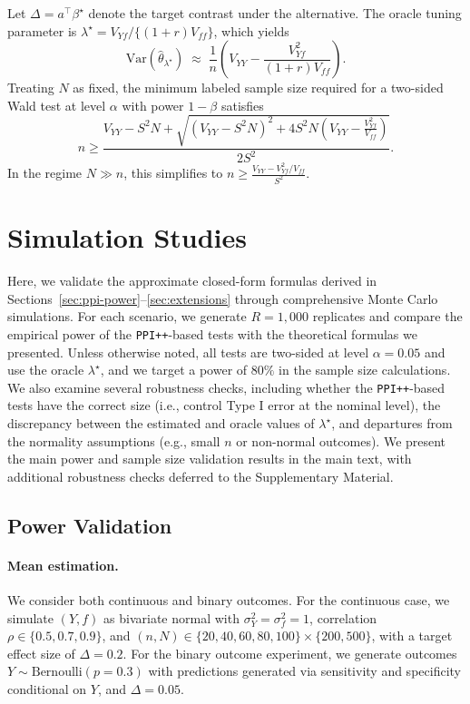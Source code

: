 \documentclass[12pt]{article}
\newcommand{\Var}{\mathrm{Var}}
\newcommand{\wh}{\widehat}
\begin{document}
\begin{proposition}\label{prop:regression-n}
Let $\Delta = a^\top\beta^\star$ denote the target contrast under the
alternative. The oracle tuning parameter is
$\lambda^\star = V_{Yf}/\{(1+r)V_{ff}\}$, which yields
\[
\Var(\wh{\theta}_{\lambda^\star})
\;\approx\;
\frac{1}{n}\left(V_{YY} - \frac{V_{Yf}^2}{(1+r)V_{ff}}\right).
\]
Treating $N$ as fixed, the minimum labeled sample size required for a two-sided
Wald test at level $\alpha$ with power $1-\beta$ satisfies
\[
n \ge
\frac{
V_{YY} - S^2N
+
\sqrt{(V_{YY}-S^2N)^2 + 4S^2N\left(V_{YY} - \frac{V_{Yf}^2}{V_{ff}}\right)}
}{2S^2}.
\]
In the regime $N \gg n$, this simplifies to $
n \ge \frac{V_{YY} - V_{Yf}^2/V_{ff}}{S^2}$.
\end{proposition}


\section{Simulation Studies}
\label{sec:simulation}

Here, we validate the approximate closed-form formulas derived in Sections~\ref{sec:ppi-power}--\ref{sec:extensions} through comprehensive Monte Carlo simulations. For each scenario, we generate $R = 1{,}000$ replicates and compare the empirical power of the \texttt{PPI++}-based tests with the theoretical formulas we presented. Unless otherwise noted, all tests are two-sided at level $\alpha = 0.05$ and use the oracle $\lambda^\star$, and we target a power of $80\%$ in the sample size calculations. We also examine several robustness checks, including whether the \texttt{PPI++}-based tests have the correct size (i.e., control Type I error at the nominal level), the discrepancy between the estimated and oracle values of $\lambda^\star$, and departures from the normality assumptions (e.g., small $n$ or non-normal outcomes). We present the main power and sample size validation results in the main text, with additional robustness checks deferred to the Supplementary Material.

\subsection{Power Validation}
\label{sec:sim-core}

\paragraph{Mean estimation.}
We consider both continuous and binary outcomes. For the continuous case, we simulate $(Y, f)$ as bivariate normal with $\sigma_Y^2 = \sigma_f^2 = 1$, correlation $\rho \in \{0.5, 0.7, 0.9\}$, and
$(n, N) \in \{20, 40, 60, 80, 100\} \times \{200, 500\}$, with a target effect size of $\Delta = 0.2$. For the binary outcome experiment, we generate outcomes $Y \sim \mathrm{Bernoulli}(p = 0.3)$ with predictions generated via sensitivity and specificity conditional on $Y$, and $\Delta = 0.05$.
\end{document}
